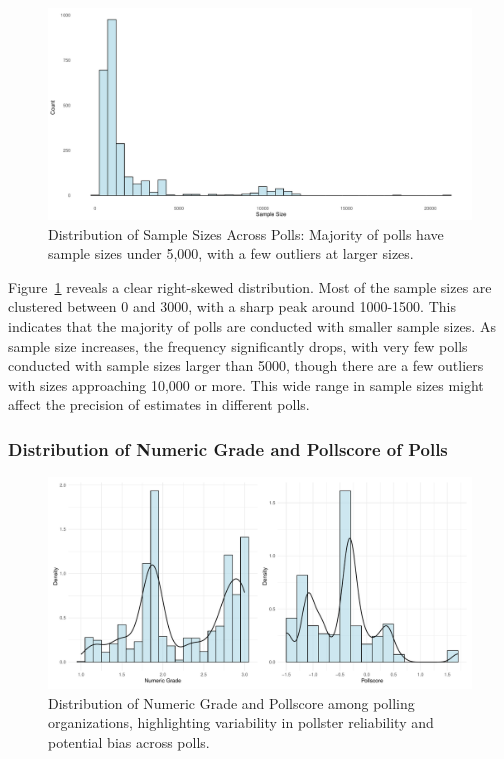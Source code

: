 \documentclass[
  letterpaper,
  DIV=11,
  numbers=noendperiod]{scrartcl}
\begin{document}
\begin{figure}

{\centering \includegraphics{paper_files/figure-pdf/fig-ss-1.pdf}

}

\caption{\label{fig-ss}Distribution of Sample Sizes Across Polls:
Majority of polls have sample sizes under 5,000, with a few outliers at
larger sizes.}

\end{figure}

Figure~\ref{fig-ss} reveals a clear right-skewed distribution. Most of
the sample sizes are clustered between 0 and 3000, with a sharp peak
around 1000-1500. This indicates that the majority of polls are
conducted with smaller sample sizes. As sample size increases, the
frequency significantly drops, with very few polls conducted with sample
sizes larger than 5000, though there are a few outliers with sizes
approaching 10,000 or more. This wide range in sample sizes might affect
the precision of estimates in different polls.

\hypertarget{distribution-of-numeric-grade-and-pollscore-of-polls}{%
\subsubsection{Distribution of Numeric Grade and Pollscore of
Polls}\label{distribution-of-numeric-grade-and-pollscore-of-polls}}

\begin{figure}

{\centering \includegraphics{paper_files/figure-pdf/fig-reli-1.pdf}

}

\caption{\label{fig-reli}Distribution of Numeric Grade and Pollscore
among polling organizations, highlighting variability in pollster
reliability and potential bias across polls.}

\end{figure}
\end{document}

